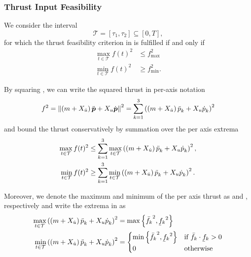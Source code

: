 \subsubsection{Thrust Input Feasibility}
We consider the interval 
\begin{equation}
	\mathcal{T} = \left[\tau_1,\tau_2\right] \subseteq \left[0,T\right]
	,
\end{equation}
for which the thrust feasibility criterion in  is fulfilled if and only if
\begin{align}
	\label{eq:thrust-feasibility-equivilency-max}
	\max_{t \in \mathcal{T}} f(t)^2
	&\leq
	f_\text{max}^2 \\
	\label{eq:thrust-feasibility-equivilency-min}
	\min_{t \in \mathcal{T}} f(t)^2
	&\geq
	f_\text{min}^2
	.
\end{align}

By squaring , we can write the squared thrust in per-axis notation
\begin{equation}
	\label{eq:thrust-squared-per-axis}
	f^2 = 
	\left\lVert
	\left(m + X_{\dot{u}}\right) \mbox{$\ddot{\bm{p}}$} + X_u \mbox{$\dot{\bm{p}}$}
	\right\rVert^2
	= 
	\sum_{k=1}^{3}
	\left(\left(m + X_{\dot{u}}\right)\mbox{$\ddot{p}$}_k + X_u \mbox{$\dot{p}$}_k \right)^2
\end{equation}
and bound the thrust conservatively by summation over the per axis extrema
\begin{align}
	\label{eq:fmax-per-axis}
	\max_{t \in \mathcal{T}} f(t)^2
	&\leq
	\sum_{k=1}^{3}
	\max_{t \in \mathcal{T}}
	\left(
		\left(m + X_{\dot{u}}\right)
		\mbox{$\ddot{p}$}_k
		+ X_u \mbox{$\dot{p}$}_k
	\right)^2, \\
	\label{eq:fmin-per-axis}
	\min_{t \in \mathcal{T}} f(t)^2
	&\geq
	\sum_{k=1}^{3}
	\min_{t \in \mathcal{T}}
	\left(
		\left(m + X_{\dot{u}}\right)
		\mbox{$\ddot{p}$}_k
		+ X_u \mbox{$\dot{p}$}_k
	\right)^2
	.
\end{align}

Moreover, we denote the maximum and minimum of the per axis thrust as \fmaxaxis and \fminaxis, respectively %
and write the extrema in  as
\begin{align}
	\max_{t \in \mathcal{T}}
	\left(
		\left(m + X_{\dot{u}}\right)
		\ppp_k
		+ X_u \pp_k
	\right)^2
	&= 
	\max\left\{\fmaxaxis^2, \fminaxis^2\right\} \\
	\min_{t \in \mathcal{T}}
	\left(
		\left(m + X_{\dot{u}}\right)
		\ppp_k
		+ X_u \pp_k
	\right)^2
	&=
	\begin{cases}
		\min\left\{\fmaxaxis^2, \fminaxis^2\right\}
		& \text{if } \fmaxaxis\cdot\fminaxis > 0 \\
		0
		& \text{otherwise}
	\end{cases}
\end{align}

